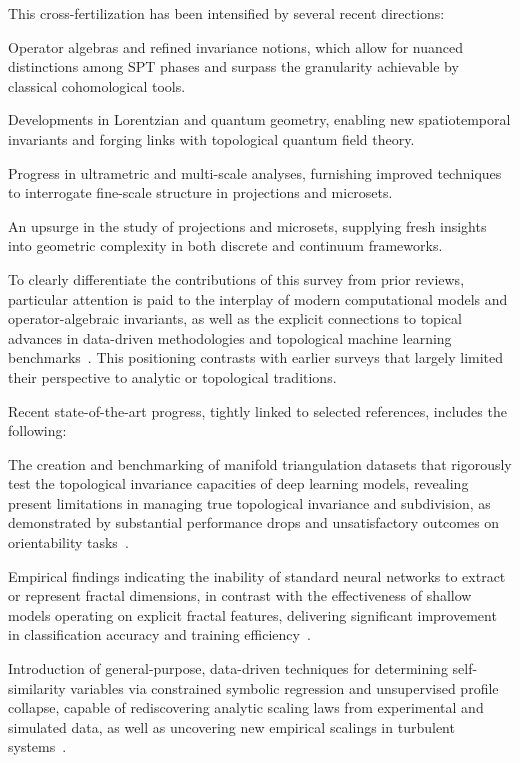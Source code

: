 \documentclass[sigconf]{acmart}
\begin{document}
This cross-fertilization has been intensified by several recent directions:

Operator algebras and refined invariance notions, which allow for nuanced distinctions among SPT phases and surpass the granularity achievable by classical cohomological tools.

Developments in Lorentzian and quantum geometry, enabling new spatiotemporal invariants and forging links with topological quantum field theory.

Progress in ultrametric and multi-scale analyses, furnishing improved techniques to interrogate fine-scale structure in projections and microsets.

An upsurge in the study of projections and microsets, supplying fresh insights into geometric complexity in both discrete and continuum frameworks.

To clearly differentiate the contributions of this survey from prior reviews, particular attention is paid to the interplay of modern computational models and operator-algebraic invariants, as well as the explicit connections to topical advances in data-driven methodologies and topological machine learning benchmarks~\cite{ref26, ref39, ref65}. This positioning contrasts with earlier surveys that largely limited their perspective to analytic or topological traditions.

Recent state-of-the-art progress, tightly linked to selected references, includes the following:

The creation and benchmarking of manifold triangulation datasets that rigorously test the topological invariance capacities of deep learning models, revealing present limitations in managing true topological invariance and subdivision, as demonstrated by substantial performance drops and unsatisfactory outcomes on orientability tasks~\cite{ref26}.

Empirical findings indicating the inability of standard neural networks to extract or represent fractal dimensions, in contrast with the effectiveness of shallow models operating on explicit fractal features, delivering significant improvement in classification accuracy and training efficiency~\cite{ref39}.

Introduction of general-purpose, data-driven techniques for determining self-similarity variables via constrained symbolic regression and unsupervised profile collapse, capable of rediscovering analytic scaling laws from experimental and simulated data, as well as uncovering new empirical scalings in turbulent systems~\cite{ref65}.
\end{document}
